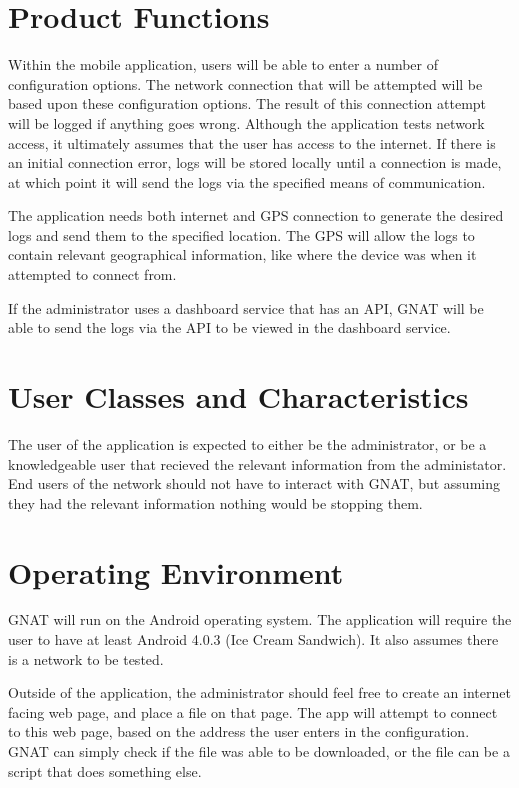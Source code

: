 \documentclass{scrreprt}
\begin{document}
\section{Product Functions}

Within the mobile application, users will be able to enter a number of configuration options.  The network connection that will be attempted will be based upon these configuration options.  The result of this connection attempt will be logged if anything goes wrong. Although the application tests network access, it ultimately assumes that the user has access to the internet.  If there is an initial connection error, logs will be stored locally until a connection is made, at which point it will send the logs via the specified means of communication.

The application needs both internet and GPS connection to generate the desired logs and send them to the specified location.  The GPS will allow the logs to contain relevant geographical information, like where the device was when it attempted to connect from.

If the administrator uses a dashboard service that has an API, GNAT will be able to send the logs via the API to be viewed in the dashboard service.
 
\section{User Classes and Characteristics}
The user of the application is expected to either be the administrator, or be a knowledgeable user that recieved the relevant information from the administator.  End users of the network should not have to interact with GNAT, but assuming they had the relevant information nothing would be stopping them.

\section{Operating Environment}
GNAT will run on the Android operating system.  The application will require the user to have at least Android 4.0.3 (Ice Cream Sandwich). It also assumes there is a network to be tested.

Outside of the application, the administrator should feel free to create an internet facing web page, and place a file on that page.  The app will attempt to connect to this web page, based on the address the user enters in the configuration. GNAT can simply check if the file was able to be downloaded, or the file can be a script that does something else.  
\end{document}
